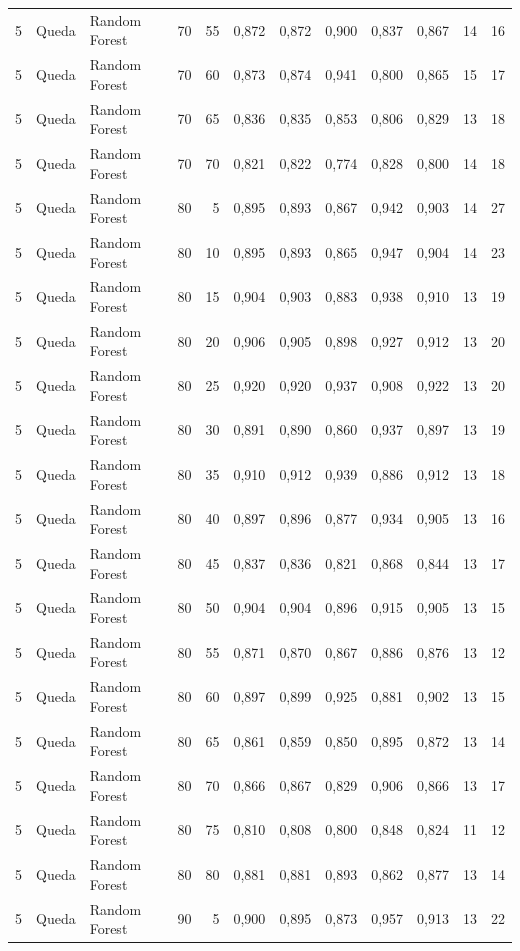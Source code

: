 \begin{longtable}{@{}rllrrrrrrrrr@{}}
5 & Queda & Random Forest & 70 & 55 & 0,872 & 0,872 & 0,900 & 0,837 & 0,867 & 14 & 16 \\
5 & Queda & Random Forest & 70 & 60 & 0,873 & 0,874 & 0,941 & 0,800 & 0,865 & 15 & 17 \\
5 & Queda & Random Forest & 70 & 65 & 0,836 & 0,835 & 0,853 & 0,806 & 0,829 & 13 & 18 \\
5 & Queda & Random Forest & 70 & 70 & 0,821 & 0,822 & 0,774 & 0,828 & 0,800 & 14 & 18 \\
5 & Queda & Random Forest & 80 & 5 & 0,895 & 0,893 & 0,867 & 0,942 & 0,903 & 14 & 27 \\
5 & Queda & Random Forest & 80 & 10 & 0,895 & 0,893 & 0,865 & 0,947 & 0,904 & 14 & 23 \\
5 & Queda & Random Forest & 80 & 15 & 0,904 & 0,903 & 0,883 & 0,938 & 0,910 & 13 & 19 \\
5 & Queda & Random Forest & 80 & 20 & 0,906 & 0,905 & 0,898 & 0,927 & 0,912 & 13 & 20 \\
5 & Queda & Random Forest & 80 & 25 & 0,920 & 0,920 & 0,937 & 0,908 & 0,922 & 13 & 20 \\
5 & Queda & Random Forest & 80 & 30 & 0,891 & 0,890 & 0,860 & 0,937 & 0,897 & 13 & 19 \\
5 & Queda & Random Forest & 80 & 35 & 0,910 & 0,912 & 0,939 & 0,886 & 0,912 & 13 & 18 \\
5 & Queda & Random Forest & 80 & 40 & 0,897 & 0,896 & 0,877 & 0,934 & 0,905 & 13 & 16 \\
5 & Queda & Random Forest & 80 & 45 & 0,837 & 0,836 & 0,821 & 0,868 & 0,844 & 13 & 17 \\
5 & Queda & Random Forest & 80 & 50 & 0,904 & 0,904 & 0,896 & 0,915 & 0,905 & 13 & 15 \\
5 & Queda & Random Forest & 80 & 55 & 0,871 & 0,870 & 0,867 & 0,886 & 0,876 & 13 & 12 \\
5 & Queda & Random Forest & 80 & 60 & 0,897 & 0,899 & 0,925 & 0,881 & 0,902 & 13 & 15 \\
5 & Queda & Random Forest & 80 & 65 & 0,861 & 0,859 & 0,850 & 0,895 & 0,872 & 13 & 14 \\
5 & Queda & Random Forest & 80 & 70 & 0,866 & 0,867 & 0,829 & 0,906 & 0,866 & 13 & 17 \\
5 & Queda & Random Forest & 80 & 75 & 0,810 & 0,808 & 0,800 & 0,848 & 0,824 & 11 & 12 \\
5 & Queda & Random Forest & 80 & 80 & 0,881 & 0,881 & 0,893 & 0,862 & 0,877 & 13 & 14 \\
5 & Queda & Random Forest & 90 & 5 & 0,900 & 0,895 & 0,873 & 0,957 & 0,913 & 13 & 22 \\

\end{longtable}
